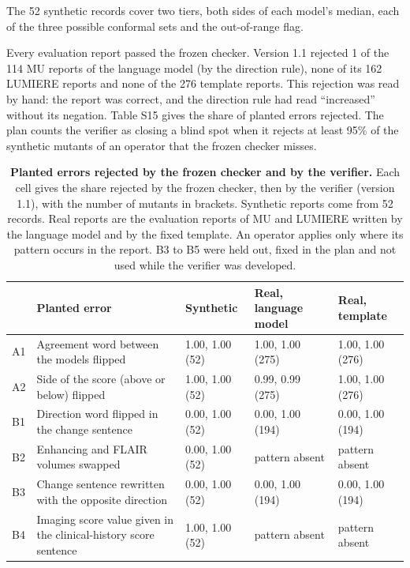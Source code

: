 \documentclass[11pt,a4paper]{article}
\begin{document}
The 52 synthetic records cover two tiers, both sides of each model's median, each of the three possible conformal
sets and the out-of-range flag.

Every evaluation report passed the frozen checker. Version 1.1 rejected 1 of the 114 MU reports of the language model
(by the direction rule), none of its 162 LUMIERE reports and none of the 276 template reports. This rejection was
read by hand: the report was correct, and the direction rule had read ``increased'' without its negation. Table S15 gives the share of planted errors
rejected. The plan counts the verifier as closing a blind spot when it rejects at least 95\% of the synthetic mutants
of an operator that the frozen checker misses.

\begin{table}[!htbp]
\renewcommand{\thetable}{S15}\renewcommand{\theHtable}{S15}
\centering
\caption{\textbf{Planted errors rejected by the frozen checker and by the verifier.} Each cell gives the share
rejected by the frozen checker, then by the verifier (version 1.1), with the number of mutants in brackets. Synthetic
reports come from 52 records. Real reports are the evaluation reports of MU and LUMIERE written by the language model
and by the fixed template. An operator applies only where its pattern occurs in the report. B3 to B5 were held out,
fixed in the plan and not used while the verifier was developed.}
\label{tab:S26d}
\scriptsize
\begin{tabularx}{\linewidth}{@{}R{0.6cm}LR{2.2cm}R{2.2cm}R{2.2cm}@{}}
\toprule
 & Planted error & Synthetic & Real, language model & Real, template \\
\midrule
A1 & Agreement word between the models flipped & 1.00, 1.00 (52) & 1.00, 1.00 (275) & 1.00, 1.00 (276) \\
A2 & Side of the score (above or below) flipped & 1.00, 1.00 (52) & 0.99, 0.99 (275) & 1.00, 1.00 (276) \\
B1 & Direction word flipped in the change sentence & 0.00, 1.00 (52) & 0.00, 1.00 (194) & 0.00, 1.00 (194) \\
B2 & Enhancing and FLAIR volumes swapped & 0.00, 1.00 (52) & pattern absent & pattern absent \\
B3 & Change sentence rewritten with the opposite direction & 0.00, 1.00 (52) & 0.00, 1.00 (194) & 0.00, 1.00 (194) \\
B4 & Imaging score value given in the clinical-history score sentence & 1.00, 1.00 (52) & pattern absent & pattern absent \\

\end{tabularx}
\end{table}
\end{document}
